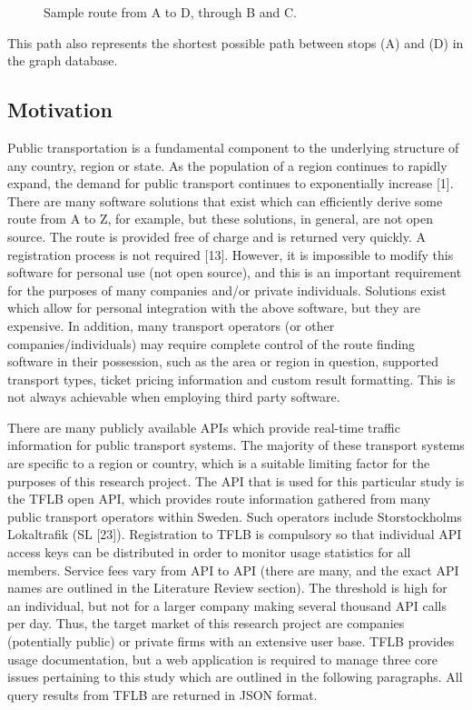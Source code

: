 \documentclass[12pt]{article}   	%
\begin{document}
\noindent
\begin{figure}[htp]

\caption{Sample route from A to D, through B and C.}
\end{figure}

\noindent
This path also represents the shortest possible path between stops (A) and (D) in the graph database.

\newpage

\subsection{Motivation}
Public transportation is a fundamental component to the underlying structure of any country, region or state. As the population of a region continues to rapidly expand, the demand for public transport continues to exponentially increase [1]. There are many software solutions that exist which can efficiently derive some route from A to Z, for example, but these solutions, in general, are not open source. The route is provided free of charge and is returned very quickly. A registration process is not required [13]. However, it is impossible to modify this software for personal use (not open source), and this is an important requirement for the purposes of many companies and/or private individuals. Solutions exist which allow for personal integration with the above software, but they are expensive. In addition, many transport operators (or other companies/individuals) may require complete control of the route finding software in their possession, such as the area or region in question, supported transport types, ticket pricing information and custom result formatting. This is not always achievable when employing third party software.
	
There are many publicly available APIs which provide real-time traffic information for public transport systems. The majority of these transport systems are specific to a region or country, which is a suitable limiting factor for the purposes of this research project.  The API that is used for this particular study is the TFLB open API, which provides route information gathered from many public transport operators within Sweden. Such operators include Storstockholms Lokaltrafik (SL [23]). Registration to TFLB is compulsory so that individual API access keys can be distributed in order to monitor usage statistics for all members. Service fees vary from API to API (there are many, and the exact API names are outlined in the Literature Review section). The threshold is high for an individual, but not for a larger company making several thousand API calls per day. Thus, the target market of this research project are companies (potentially public) or private firms with an extensive user base. TFLB provides usage documentation, but a web application is required to manage three core issues pertaining to this study which are outlined in the following paragraphs. All query results from TFLB are returned in JSON format.
	
\end{document}
